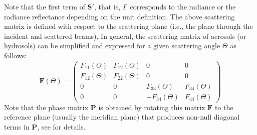 \documentclass{article}
\begin{document}
Note that the first term of $\mathbf{S'}$, that is, $I’$ corresponds to the radiance or the radiance reflectance depending on the unit definition. The above scattering matrix is defined with respect to the scattering plane (i.e., the plane through the incident and scattered beams). In general, the scattering matrix of aerosols (or hydrosols) can be simplified and expressed for a given scattering angle $\Theta$ as follows:
\begin{equation}   
\mathbf{F}(\Theta)=\begin{pmatrix}\!F_{11}(\Theta) & F_{12}(\Theta) & 0 & 0\\F_{12}(\Theta) & F_{22}(\Theta) & 0 & 0\\0 & 0 & F_{33}(\Theta) & F_{34}(\Theta)\\0 & 0 & -F_{34}(\Theta) & F_{44}(\Theta)\end{pmatrix}
\label{eq:scat_mat}
\end{equation}
Note that the phase matrix $\mathbf{P}$ is obtained by rotating this matrix $\mathbf{F}$ to the reference plane (usually the meridian plane) that produces non-null diagonal terms in $\mathbf{P}$, see \cite{Mishchenko2000a} for details.
\end{document}
